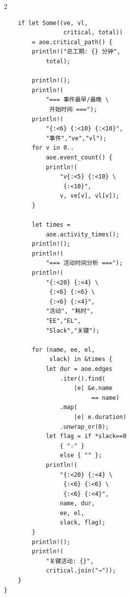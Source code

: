 {\begin{multicols}{2}
\begin{verbatim}
    if let Some((ve, vl,
                 critical, total))
        = aoe.critical_path() {
        println!("总工期: {} 分钟",
            total);

        println!();
        println!(
            "=== 事件最早/最晚 \
             开始时间 ===");
        println!(
            "{:<6} {:<10} {:<10}",
            "事件","ve","vl");
        for v in 0..
            aoe.event_count() {
            println!(
                "v{:<5} {:<10} \
                 {:<10}",
                v, ve[v], vl[v]);
        }

        let times =
            aoe.activity_times();
        println!();
        println!(
            "=== 活动时间分析 ===");
        println!(
            "{:<20} {:<4} \
             {:<6} {:<6} \
             {:<6} {:<4}",
            "活动", "耗时",
            "EE","EL",
            "Slack","关键");

        for (name, ee, el,
             slack) in &times {
            let dur = aoe.edges
                .iter().find(
                    |e| &e.name
                         == name)
                .map(
                    |e| e.duration)
                .unwrap_or(0);
            let flag = if *slack==0
                { "☆" }
                else { "" };
            println!(
                "{:<20} {:<4} \
                 {:<6} {:<6} \
                 {:<6} {:<4}",
                name, dur,
                ee, el,
                slack, flag);
        }
        println!();
        println!(
            "关键活动: {}",
            critical.join("→"));
    }
}
\end{verbatim}

\end{multicols}
}
\vspace{0.5cm}
